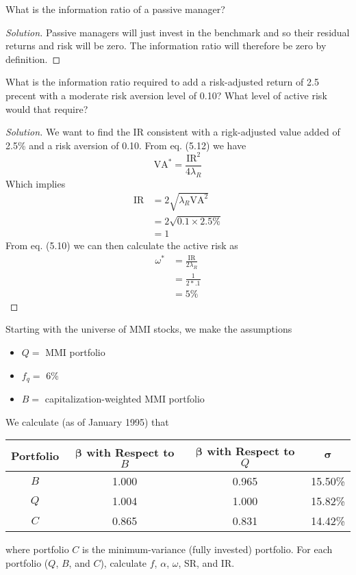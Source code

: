 \begin{problem}{5.1}
 What is the information ratio of a passive manager?
\end{problem}

\begin{proof}[Solution]
 Passive managers will just invest in the benchmark and so their residual returns and risk will be zero. The information ratio will therefore be zero by definition.
\end{proof}

\begin{problem}{5.2}
 What is the information ratio required to add a risk-adjusted return of 2.5 precent with a moderate risk aversion level of 0.10? What level of active risk would that require?
\end{problem}

\begin{proof}[Solution]
 We want to find the IR consistent with a rigk-adjusted value added of 2.5\% and a risk aversion of 0.10. From eq. (5.12) we have
 \begin{equation*}
  \mathrm{VA^{*}}=\frac{\mathrm{IR}^{2}}{4\lambda_{R}}
 \end{equation*}
 Which implies
 \begin{align*}
  \mathrm{IR}&=2\sqrt{\lambda_{R}\mathrm{VA^{2}}}\\
	     &=2\sqrt{0.1\times2.5\%}\\
	     &=1
 \end{align*}
 From eq. (5.10) we can then calculate the active risk as
 \begin{align*}
  \omega^{*}&=\frac{\mathrm{IR}}{2\lambda_{R}}\\
	    &=\frac{1}{2*.1}\\
	    &=5\%
 \end{align*}
\end{proof}

\begin{problem}{5.3}
 Starting with the universe of MMI stocks, we make the assumptions
 \begin{itemize}
  \item[]{$Q=$ MMI portfolio}
  \item[]{$f_{q}=$ 6\%}
  \item[]{$B=$ capitalization-weighted MMI portfolio}
 \end{itemize}
 We calculate (as of January 1995) that
 \begin{center}
 \begin{tabular}{c c c c}
  \centering
  \textbf{Portfolio}	& $\bm{\beta}$ \textbf{with Respect to $B$}	& $\bm{\beta}$ \textbf{with Respect to $Q$}	& \textbf{$\bm{\sigma}$}	\\
  \hline
  $B$	& 1.000	& 0.965	& 15.50\% \\
  $Q$	& 1.004	& 1.000	& 15.82\% \\
  $C$	& 0.865	& 0.831 & 14.42\% \\
 \end{tabular}
 \end{center}
 where portfolio $C$ is the minimum-variance (fully invested) portfolio. For each portfolio ($Q$, $B$, and $C$), calculate $f$, $\alpha$, $\omega$, SR, and IR.
\end{problem}

